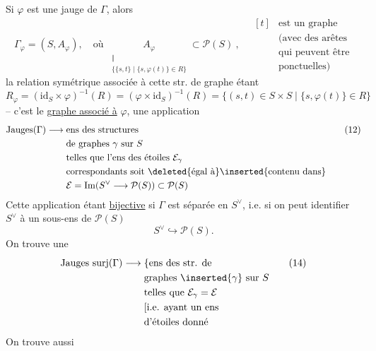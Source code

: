 Si $\varphi$ est une jauge de $\Gamma$, alors
\[
 \Gamma_\varphi=(S,A_\varphi),\quad\text{où }\ 
 \underset{\substack{\Vert\\\{\{s,t\}\mid\{s,\varphi(t)\}\in R\}}}{A_\varphi}\subset\mathcal P(S)
 \ ,\quad\begin{aligned}[t]&\text{est un graphe}\\&\text{(avec des arêtes}\\
 &\text{qui peuvent être}\\&\text{ponctuelles)}
 \end{aligned}\tag*{(10)}
\]
la relation symétrique associée à cette str. de
graphe étant
\[
 R_\varphi=(\mathrm{id}_S\times\varphi)^{-1}(R)=(\varphi\times\mathrm{id}_S)^{-1}(R)
 =\{(s,t)\in S\times S\mid\{s,\varphi(t)\}\in R\}\tag*{(11)}
\]
-- c'est le \uline{graphe associé à} $\varphi$, 
\inserted{On trouve ainsi} \deleted{sép} une application
\[
 \mathrm{Jauges}(\Gamma)\longrightarrow
 \begin{aligned}[t]&\text{ens des structures}\\&\text{de graphes }\gamma\text{ sur }S\\
 &\text{telles que l'ens des étoiles }\mathcal E_\gamma\\
 &\text{correspondants soit }\deleted{\text{égal à}}\inserted{\text{contenu dans}}\\
 &\mathcal E=\mathrm{Im}(S^\vee\longrightarrow\mathcal P(S))\subset\mathcal P(S)
 \end{aligned}\tag*{(12)}
\]
Cette application étant \uline{bijective} si $\Gamma$ est séparée en $S^\vee$,
i.e. si on peut identifier $S^\vee$ à \deleted{\unsure{l'}} un sous-ens de $\mathcal P(S)$
\[
 S^\vee\hookrightarrow\mathcal P(S).\tag*{(13)}
\]
 On trouve une  
\[
 \mathrm{Jauges\ surj}(\Gamma)\longrightarrow
 \begin{aligned}[t]&\{\text{ens des str. de}\\&\text{graphes }\inserted{\gamma}\text{ sur }S\\
 &\text{telles que }\mathcal E_\gamma=\mathcal E\\
 &[\text{i.e. ayant un ens}\\&\text{d'étoiles donné}
 \end{aligned}\tag*{(14)}
\]
On trouve aussi

